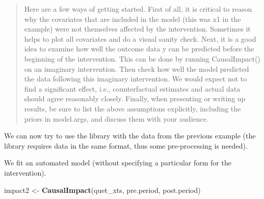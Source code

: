 \documentclass[
]{article}
\newenvironment{Shaded}{\begin{snugshade}}{\end{snugshade}}
\newcommand{\DataTypeTok}[1]{\textcolor[rgb]{0.13,0.29,0.53}{#1}}
\newcommand{\KeywordTok}[1]{\textcolor[rgb]{0.13,0.29,0.53}{\textbf{#1}}}
\newcommand{\NormalTok}[1]{#1}
\newcommand{\OperatorTok}[1]{\textcolor[rgb]{0.81,0.36,0.00}{\textbf{#1}}}
\newcommand{\StringTok}[1]{\textcolor[rgb]{0.31,0.60,0.02}{#1}}
\begin{document}
\begin{quote}
Here are a few ways of getting started. First of all, it is critical to reason why the covariates that are included in the model (this was x1 in the example) were not themselves affected by the intervention. Sometimes it helps to plot all covariates and do a visual sanity check. Next, it is a good idea to examine how well the outcome data y can be predicted before the beginning of the intervention. This can be done by running CausalImpact() on an imaginary intervention. Then check how well the model predicted the data following this imaginary intervention. We would expect not to find a significant effect, i.e., counterfactual estimates and actual data should agree reasonably closely. Finally, when presenting or writing up results, be sure to list the above assumptions explicitly, including the priors in model.args, and discuss them with your audience.
\end{quote}

We can now try to use the library with the data from the previous example (the library requires data in the same format, thus some pre-processing is needed).

\begin{Shaded}
\end{Shaded}

We fit an automated model (without specifying a particular form for the intervention).

\begin{Shaded}
\begin{Highlighting}[]
\NormalTok{impact2 <-}\StringTok{ }\KeywordTok{CausalImpact}\NormalTok{(quet_xts, pre.period, post.period)}
\end{Highlighting}
\end{Shaded}
\end{document}
